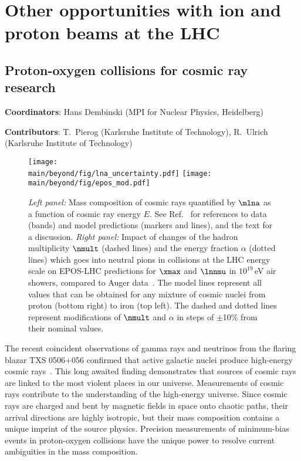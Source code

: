 \documentclass[../report.tex]{subfiles}
\providecommand{\main}{..}
\begin{document}
\section{Other opportunities with ion and proton beams at the LHC}


\clearpage




\clearpage
\subsection{Proton-oxygen collisions for cosmic ray research}
\label{sec:pOcosmic}
{ \small
\noindent \textbf{Coordinators}: Hans Dembinski (MPI for Nuclear Physics, Heidelberg)

\noindent \textbf{Contributors}:
T.~Pierog (Karlsruhe Institute of Technology),
R.~Ulrich (Karlsruhe Institute of Technology)
}

\begin{figure}
\texttt{[image: \\main/beyond/fig/lna\_uncertainty.pdf]}
\texttt{[image: \\main/beyond/fig/epos\_mod.pdf]}
\caption{\emph{Left panel:} Mass composition of cosmic rays quantified by $\mlna$ as a function of cosmic ray energy $E$. See Ref.~\cite{kampert_cr_review} for references to data (bands) and model predictions (markers and lines), and the text for a discussion. \emph{Right panel:} Impact of changes of the hadron multiplicity $\nmult$ (dashed lines) and the energy fraction $\alpha$ (dotted lines) which goes into neutral pions in collisions at the LHC energy scale on EPOS-LHC predictions for $\xmax$ and $\lnnmu$ in $10^{19}$\,\si{eV} air showers, compared to Auger data~\cite{Aab:2014pza}. The model lines represent all values that can be obtained for any mixture of cosmic nuclei from proton (bottom right) to iron (top left). The dashed and dotted lines represent modifications of $\nmult$ and $\alpha$ in steps of $\pm$10\% from their nominal values.}
\label{fig:cosmic_rays}
\end{figure}

The recent coincident observations of gamma rays and neutrinos from the flaring blazar TXS 0506+056 confirmed that active galactic nuclei produce high-energy cosmic rays~\cite{IceCube:2018dnn}. This long awaited finding demonstrates that sources of cosmic rays are linked to the most violent places in our universe. Measurements of cosmic rays contribute to the understanding of the high-energy universe. Since cosmic rays are charged and bent by magnetic fields in space onto chaotic paths, their arrival directions are highly isotropic, but their mass composition contains a unique imprint of the source physics. Precision measurements of minimum-bias events in proton-oxygen collisions have the unique power to resolve current ambiguities in the mass composition.
\end{document}
